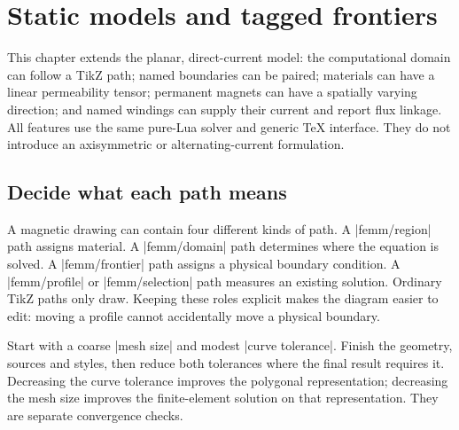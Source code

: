 \section{Static models and tagged frontiers}
\label{sec:static}
This chapter extends the planar, direct-current model: the computational domain
can follow a TikZ path; named boundaries can be paired; materials can have a
linear permeability tensor; permanent magnets can have a spatially varying
direction; and named windings can supply their current and report flux linkage.
All features use the same pure-Lua solver and generic TeX interface.
They do not introduce an axisymmetric or alternating-current formulation.

\subsection{Decide what each path means}
A magnetic drawing can contain four different kinds of path. A |femm/region|
path assigns material. A |femm/domain| path determines where the equation is
solved. A |femm/frontier| path assigns a physical boundary condition. A
|femm/profile| or |femm/selection| path measures an existing solution. Ordinary
TikZ paths only draw. Keeping these roles explicit makes the diagram easier to
edit: moving a profile cannot accidentally move a physical boundary.

Start with a coarse |mesh size| and modest |curve tolerance|. Finish the geometry,
sources and styles, then reduce both tolerances where the final result requires
it. Decreasing the curve tolerance improves the polygonal representation;
decreasing the mesh size improves the finite-element solution on that
representation. They are separate convergence checks.

